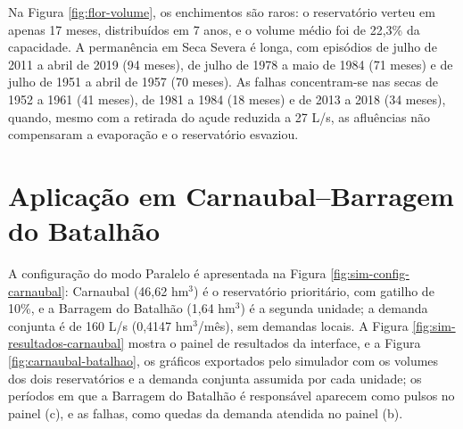 \begin{table}[H]
    \captionsetup{width=15cm}
    \caption{Distribuição dos estados operacionais de Flor do Campo por mês do ano (\% dos meses)}
    \label{tab:flor-estados-mes}
    \centering
    \scriptsize
\end{table}

Na Figura \ref{fig:flor-volume}, os enchimentos são raros: o reservatório verteu em apenas 17 meses, distribuídos em 7 anos, e o volume médio foi de 22,3\% da capacidade. A permanência em Seca Severa é longa, com episódios de julho de 2011 a abril de 2019 (94 meses), de julho de 1978 a maio de 1984 (71 meses) e de julho de 1951 a abril de 1957 (70 meses). As falhas concentram-se nas secas de 1952 a 1961 (41 meses), de 1981 a 1984 (18 meses) e de 2013 a 2018 (34 meses), quando, mesmo com a retirada do açude reduzida a 27 L/s, as afluências não compensaram a evaporação e o reservatório esvaziou.

\section{Aplicação em Carnaubal--Barragem do Batalhão}
\label{sec:aplicacao-carnaubal}

A configuração do modo Paralelo é apresentada na Figura \ref{fig:sim-config-carnaubal}: Carnaubal (46,62 hm$^3$) é o reservatório prioritário, com gatilho de 10\%, e a Barragem do Batalhão (1,64 hm$^3$) é a segunda unidade; a demanda conjunta é de 160 L/s (0,4147 hm$^3$/mês), sem demandas locais. A Figura \ref{fig:sim-resultados-carnaubal} mostra o painel de resultados da interface, e a Figura \ref{fig:carnaubal-batalhao}, os gráficos exportados pelo simulador com os volumes dos dois reservatórios e a demanda conjunta assumida por cada unidade; os períodos em que a Barragem do Batalhão é responsável aparecem como pulsos no painel (c), e as falhas, como quedas da demanda atendida no painel (b).

